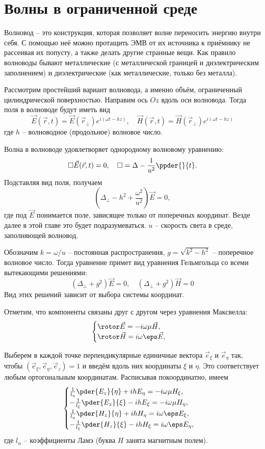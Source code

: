 \chapter{Волны в ограниченной среде}

Волновод -- это конструкция, которая позволяет волне переносить энергию внутри себя. С помощью неё можно протащить ЭМВ от их источника к приёмнику не рассеивая их попусту, а также делать другие странные вещи. Как правило волноводы бывают металлические (с металлической границей и диэлектрическим заполнением) и диэлектрические (как металлические, только без металла).

Рассмотрим простейший вариант волновода, а именно объём, ограниченный цилиндрической поверхностью. Направим ось \( Oz \) вдоль оси волновода. Тогда поля в волноводе будут иметь вид
\[
	\vec{E}(\vec{r}, t) = \vec{E}(\vec{r}_\perp)e^{i(\omega t - hz)},\quad
	\vec{H}(\vec{r}, t) = \vec{H}(\vec{r}_\perp)e^{i(\omega t - hz)}
\]
где \( h \) -- волноводное (продольное) волновое число.

Волна в волноводе удовлетворяет однородному волновому уравнению:
\[
	\square \vec{E}(\vec{r}, t) = 0,\quad \square = \Delta - \frac{1}{u^2}\ppder{}{t}.
\]
Подставляя вид поля, получаем
\[
	\left(\Delta_\perp - h^2 + \frac{\omega^2}{u^2}\right) \vec{E} = 0,
\]
где под \( \vec{E} \) понимается поле, зависящее только от поперечных координат. Везде далее в этой главе это будет подразумеваться. \( u \) -- скорость света в среде, заполняющей волновод.

Обозначим \( k = \omega / u \) -- постоянная распространения, \( g = \sqrt{k^2 - h^2} \) -- поперечное волновое число. Тогда уравнение примет вид уравнения Гельмгольца со всеми вытекающими решениями:
\[
	(\Delta_\perp + g^2) \vec{E} = 0, \quad (\Delta_\perp + g^2) \vec{H} = 0
\]
Вид этих решений зависит от выбора системы координат.

Отметим, что компоненты связаны друг с другом через уравнения Максвелла:
\[
	\begin{cases}
		\rotor\vec{E} = -i\omega\mu\vec{H},\\
		\rotor\vec{H} = i\omega\eps\vec{E},
	\end{cases}
\]

Выберем в каждой точке перпендикулярные единичные вектора \( \vec{e}_\xi \) и \( \vec{e}_\eta \) так, чтобы \( (\vec{e}_\xi, \vec{e}_\eta, \vec{e}_z) = 1 \) и введём вдоль них координаты \( \xi \) и \( \eta \). Это соответствует любым ортогональным координатам. Расписывая покоординатно, имеем
\[
	\begin{cases}
		\frac{1}{l_\eta}\pder{E_z}{\eta} + ih E_\eta = -i\omega\mu H_\xi,\\
		-\frac{1}{l_\xi}\pder{E_z}{\xi} - ih E_\xi = -i\omega\mu H_\eta,\\
		\frac{1}{l_\eta}\pder{H_z}{\eta} + ihH_\eta = i\omega\eps E_\xi,\\
		-\frac{1}{l_\xi}\pder{H_z}{\xi} - ihH_\xi = i\omega\eps E_\eta,\\
	\end{cases}
\]
где \( l_\alpha \) -- коэффициенты Ламэ (буква \( H \) занята магнитным полем).


